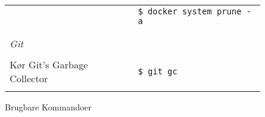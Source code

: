\begin{figure}[H]
\begin{tabular}{l l}
\begin{minipage}
        \end{minipage}&
        \begin{minipage}
            {0.5\textwidth}
            \texttt{\$ docker system prune -a}
        \end{minipage} \\
        & \\
        \hline
        & \\
        \textit{Git} & \\
        & \\
        \begin{minipage}
            {0.5\textwidth}
            Kør Git's Garbage Collector
        \end{minipage}&
        \begin{minipage}
            {0.5\textwidth}
            \texttt{\$ git gc}
        \end{minipage} \\
        & \\
    \end{tabular}
    \caption{Brugbare Kommandoer}
    \label{fig:brugbare-kommandoer}
\end{figure}
